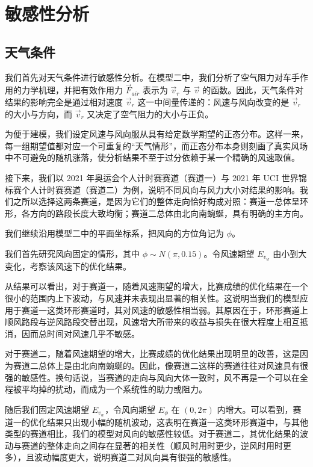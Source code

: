 \documentclass[11pt,a4paper]{ctexart}
\begin{document}
\section{敏感性分析}

\subsection{天气条件}

我们首先对天气条件进行敏感性分析。在模型二中，我们分析了空气阻力对车手作用的力学机理，并把有效作用力 $\vec{F}_{air}$ 表示为 $\vec{v}_r$ 与 $\vec{v}$ 的函数。因此，天气条件对结果的影响完全是通过相对速度 $\vec{v}_r$ 这一中间量传递的：风速与风向改变的是 $\vec{v}_r$ 的大小与方向，而 $\vec{v}_r$ 又决定了空气阻力的大小与正负。

为便于建模，我们设定风速与风向服从具有给定数学期望的正态分布。这样一来，每一组期望值都对应一个可重复的“天气情形”，而正态分布本身则刻画了真实风场中不可避免的随机涨落，使分析结果不至于过分依赖于某一个精确的风速取值。

接下来，我们以 2021 年奥运会个人计时赛赛道（赛道一）与 2021 年 UCI 世界锦标赛个人计时赛赛道（赛道二）为例，说明不同风向与风力大小对结果的影响。我们之所以选择这两条赛道，是因为它们的整体走向恰好构成对照：赛道一总体呈环形，各方向的路段长度大致均衡；赛道二总体由北向南蜿蜒，具有明确的主方向。

我们继续沿用模型二中的平面坐标系，把风向的方位角记为 $\phi$。

我们首先研究风向固定的情形，其中 $\phi\sim N(\pi,0.15)$。令风速期望 $E_{v_w}$ 由小到大变化，考察该风速下的优化结果。

从结果可以看出，对于赛道一，随着风速期望的增大，比赛成绩的优化结果在一个很小的范围内上下波动，与风速并未表现出显著的相关性。这说明当我们的模型应用于赛道一这类环形赛道时，其对风速的敏感性相当弱。其原因在于，环形赛道上顺风路段与逆风路段交替出现，风速增大所带来的收益与损失在很大程度上相互抵消，因而总时间对风速几乎不敏感。

对于赛道二，随着风速期望的增大，比赛成绩的优化结果出现明显的改善，这是因为赛道二总体上是由北向南蜿蜒的。因此，像赛道二这样的赛道往往对风速具有很强的敏感性。换句话说，当赛道的走向与风向大体一致时，风不再是一个可以在全程被平均掉的扰动，而成为一个系统性的助力或阻力。

随后我们固定风速期望 $E_{v_w}$，令风向期望 $E_\phi$ 在 $(0,2\pi)$ 内增大。可以看到，赛道一的优化结果只出现小幅的随机波动，这表明在赛道一这类环形赛道中，与其他类型的赛道相比，我们的模型对风向的敏感性较低。对于赛道二，其优化结果的波动与赛道的整体走向之间存在显著的相关性（顺风时用时更少，逆风时用时更多），且波动幅度更大，说明赛道二对风向具有很强的敏感性。
\end{document}
